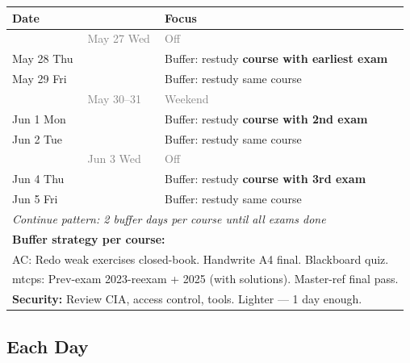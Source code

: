 \documentclass[11pt,a4paper]{article}
\begin{document}
\renewcommand{\arraystretch}{1.3}
\begin{center}
\begin{tabular}{lll}
\toprule
\textbf{Date} & & \textbf{Focus} \\
\midrule
  & \textcolor{gray}{May 27 Wed} & \textcolor{gray}{Off} \\
May 28 Thu & & Buffer: restudy \textbf{course with earliest exam} \\
May 29 Fri & & Buffer: restudy same course \\
  & \textcolor{gray}{May 30--31} & \textcolor{gray}{Weekend} \\
Jun 1 Mon & & Buffer: restudy \textbf{course with 2nd exam} \\
Jun 2 Tue & & Buffer: restudy same course \\
  & \textcolor{gray}{Jun 3 Wed} & \textcolor{gray}{Off} \\
Jun 4 Thu & & Buffer: restudy \textbf{course with 3rd exam} \\
Jun 5 Fri & & Buffer: restudy same course \\
\multicolumn{3}{l}{\textit{Continue pattern: 2 buffer days per course until all exams done}} \\
\midrule
\multicolumn{3}{l}{\textbf{Buffer strategy per course:}} \\
\multicolumn{3}{l}{\textcolor{accolor}{AC:} Redo weak exercises closed-book. Handwrite A4 final. Blackboard quiz.} \\
\multicolumn{3}{l}{\textcolor{mtcpscolor}{mtcps:} Prev-exam 2023-reexam + 2025 (with solutions). Master-ref final pass.} \\
\multicolumn{3}{l}{\textbf{Security:} Review CIA, access control, tools. Lighter --- 1 day enough.} \\
\bottomrule
\end{tabular}
\end{center}

\subsection{Each Day}

\begin{center}
\end{center}
\end{document}
